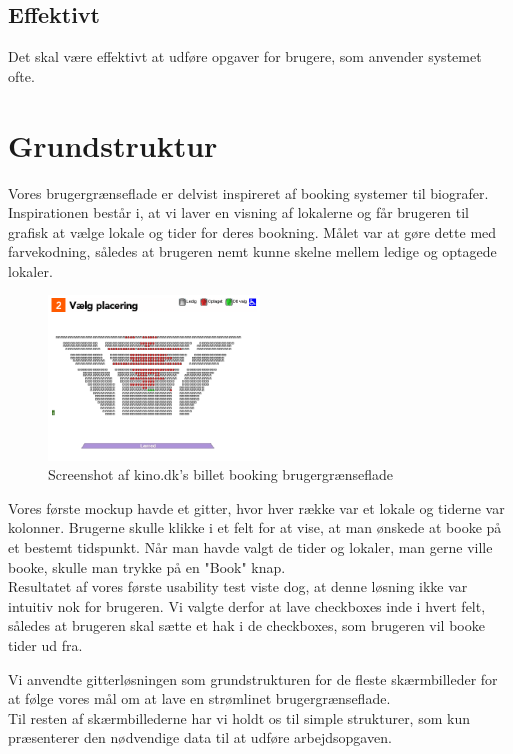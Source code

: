 \subsection{Effektivt}
Det skal være effektivt at udføre opgaver for brugere, som anvender systemet ofte.

\section{Grundstruktur}
\label{Design_G_Structure}
Vores brugergrænseflade er delvist inspireret af booking systemer til biografer. Inspirationen består i, at vi laver en visning af lokalerne og får brugeren til grafisk at vælge lokale og tider for deres bookning. Målet var at gøre dette med farvekodning, således at brugeren nemt kunne skelne mellem ledige og optagede lokaler.

\begin{figure}[h!]
  \centering
    \includegraphics[width=0.5\textwidth]{Appendix/GUI-Prototype/KinoBooking}
  \caption{Screenshot af kino.dk's billet booking brugergrænseflade}
\label{Design_G_Structure_kino}
\end{figure}

Vores første mockup havde et gitter, hvor hver række var et lokale og tiderne var kolonner. Brugerne skulle klikke i et felt for at vise, at man ønskede at booke på et bestemt tidspunkt. Når man havde valgt de tider og lokaler, man gerne ville booke, skulle man trykke på en "Book" knap. 
\\Resultatet af vores første usability test viste dog, at denne løsning ikke var intuitiv nok for brugeren. Vi valgte derfor at lave checkboxes inde i hvert felt, således at brugeren skal sætte et hak i de checkboxes, som brugeren vil booke tider ud fra. 

Vi anvendte gitterløsningen som grundstrukturen for de fleste skærmbilleder for at følge vores mål om at lave en strømlinet brugergrænseflade. 
\\Til resten af skærmbillederne har vi holdt os til simple strukturer, som kun præsenterer den nødvendige data til at udføre arbejdsopgaven.

